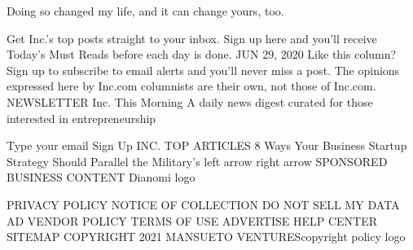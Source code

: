 Doing so changed my life, and it can change yours, too.

Get Inc.’s top posts straight to your inbox. Sign up here and you’ll receive Today’s Must Reads before each day is done.
JUN 29, 2020
Like this column? Sign up to subscribe to email alerts and you'll never miss a post.
The opinions expressed here by Inc.com columnists are their own, not those of Inc.com.
NEWSLETTER
Inc. This Morning
A daily news digest curated for those interested in entrepreneurship

Type your email
Sign Up
INC. TOP ARTICLES
8 Ways Your Business Startup Strategy Should Parallel the Military's
left arrow
right arrow
SPONSORED BUSINESS CONTENT
Dianomi logo

PRIVACY POLICY
NOTICE OF COLLECTION
DO NOT SELL MY DATA
AD VENDOR POLICY
TERMS OF USE
ADVERTISE
HELP CENTER
SITEMAP
COPYRIGHT 2021 MANSUETO VENTUREScopyright policy logo